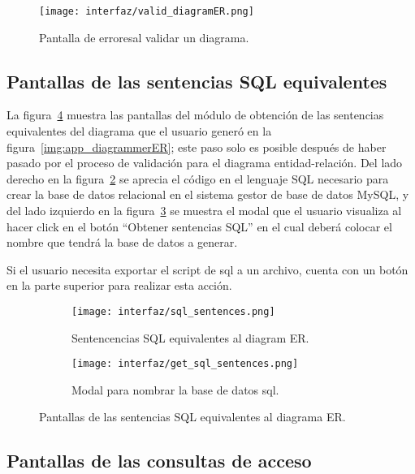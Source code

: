 \begin{figure}[H]
    \centering
    \texttt{[image: interfaz/valid\_diagramER.png]}
    \caption{Pantalla de erroresal validar un diagrama.}
    \label{img:app_validDiagram}
\end{figure}

\subsection*{Pantallas de las sentencias SQL equivalentes}

La figura~\ref{img:app_sqlSentences} muestra las pantallas del módulo de obtención de las sentencias equivalentes del diagrama que el usuario generó en la figura~\ref{img:app_diagrammerER}; este paso solo es posible después de haber pasado por el proceso de validación para el diagrama entidad-relación.
Del lado derecho en la figura~\ref{img:app_sqlScript} se aprecia el código en el lenguaje SQL necesario para crear la base de datos relacional en el sistema gestor de base de datos MySQL, y del lado izquierdo en la figura~\ref{img:app_dbName} se muestra el modal que el usuario visualiza al hacer click en el botón ``Obtener sentencias SQL'' en el cual deberá colocar el nombre que tendrá la base de datos a generar.

Si el usuario necesita exportar el script de sql a un archivo, cuenta con un botón en la parte superior para realizar esta acción.

\begin{figure}[H]
    \begin{subfigure}[b]{0.49\textwidth}
        \texttt{[image: interfaz/sql\_sentences.png]}
        \caption{Sentencencias SQL equivalentes al diagram ER.}
        \label{img:app_sqlScript}
      \end{subfigure}
      \hfill
      \begin{subfigure}[b]{0.49\textwidth}
        \texttt{[image: interfaz/get\_sql\_sentences.png]}
        \caption{Modal para nombrar la base de datos sql.}
        \label{img:app_dbName}
      \end{subfigure}
    \caption{Pantallas de las sentencias SQL equivalentes al diagrama ER.}
    \label{img:app_sqlSentences}
\end{figure}

\subsection*{Pantallas de las consultas de acceso}

